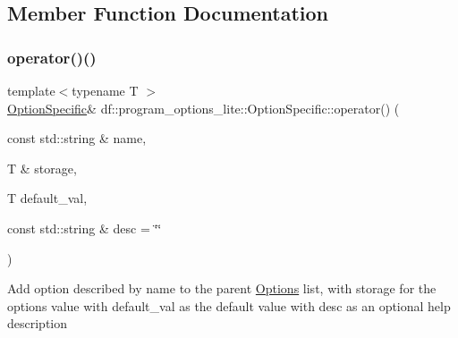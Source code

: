 \subsection{Member Function Documentation}
\mbox{\label{classdf_1_1program__options__lite_1_1_option_specific_acea9355e21c8508c877d026b0607dc43}} 
\subsubsection{\texorpdfstring{operator()()}{operator()()}\hspace{0.1cm}{\footnotesize\ttfamily [1/2]}}
{\footnotesize\ttfamily template$<$typename T $>$ \\
\hyperlink{classdf_1_1program__options__lite_1_1_option_specific}{Option\+Specific}\& df\+::program\+\_\+options\+\_\+lite\+::\+Option\+Specific\+::operator() (\begin{DoxyParamCaption}\item[{const std\+::string \&}]{name,  }\item[{T \&}]{storage,  }\item[{T}]{default\+\_\+val,  }\item[{const std\+::string \&}]{desc = {\ttfamily \char`\"{}\char`\"{}} }\end{DoxyParamCaption})\hspace{0.3cm}{\ttfamily [inline]}}

Add option described by name to the parent \hyperlink{structdf_1_1program__options__lite_1_1_options}{Options} list, with storage for the option\textquotesingle{}s value with default\+\_\+val as the default value with desc as an optional help description \mbox{\label{classdf_1_1program__options__lite_1_1_option_specific_a757b17855cd89bc536c51f5c7e716d83}} 
